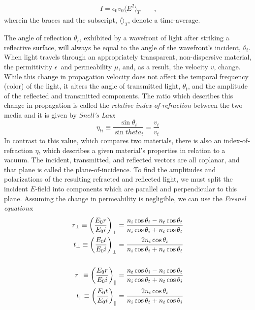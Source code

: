 \documentclass[a4paper,10pt]{report}
\numberwithin{equation}{section}
\begin{document}
{\begin{section}
\begin{align}
I = \epsilon_0 v_0 \langle E^2 \rangle_T \qquad \text{,}
\end{align}
wherein the braces and the subscript, $\langle \rangle_T$, denote a time-average. \cite[p.~48]{Hecht1987}
\par
The angle of reflection $\theta_r$, exhibited by a wavefront of light after striking a reflective surface, will always be equal to the angle of the wavefront's incident, $\theta_i$. When light travels through an appropriately transparent, non-dispersive material, the permittivity $\epsilon$\  and permeability $\mu$, and, as a result, the velocity $v$, change. While this change in propagation velocity does not affect the temporal frequency (color) of the light, it alters the angle of transmitted light, $\theta_t$, and the amplitude of the reflected and transmitted components. The ratio which describes this change in propagation is called the \emph{relative index-of-refraction} between the two media and it is given by \emph{Snell's Law}\cite[p.97]{Hecht1987}:
\begin{equation}
\eta_{ti} \equiv \frac{\sin{\theta_i}}{\sin{theta_t}} = \frac{v_i}{v_t}
\end{equation}
In contrast to this value, which compares two materials, there is also an index-of-refraction $\eta$, which describes a given material's properties in relation to a vacuum. The incident, transmitted, and reflected vectors are all coplanar, and that plane is called the plane-of-incidence. To find the amplitudes and polarizations of the resulting refracted and reflected light, we must split the incident $E$-field into components which are parallel and perpendicular to this plane. Assuming the change in permeability is negligible, we can use the \emph{Fresnel equations}: \cite[p.~109]{Hecht1987}
\begin{align}
r_\perp \equiv \left( \frac{E_0r}{E_0i} \right)_\perp = \frac{n_i \cos{\theta_i} - n_t \cos{\theta_t}}{n_i \cos{\theta_i} + n_t \cos{\theta_t}}\notag\\
t_\perp \equiv \left( \frac{E_0t}{E_0i} \right)_\perp = \frac{2n_i \cos{\theta_i}}{n_i \cos{\theta_i} + n_t \cos{\theta_t}}\notag\\
{}\notag\\
r_\parallel \equiv \left( \frac{E_0r}{E_0i} \right)_\parallel = \frac{n_t \cos{\theta_i} - n_i \cos{\theta_t}}{n_i \cos{\theta_t} + n_t \cos{\theta_i}}\\
t_\parallel \equiv \left( \frac{E_0t}{E_0i} \right)_\parallel = \frac{2n_i \cos{\theta_i}}{n_i \cos{\theta_t} + n_t \cos{\theta_i}}\notag

\end{align}
\end{section}}
\end{document}

